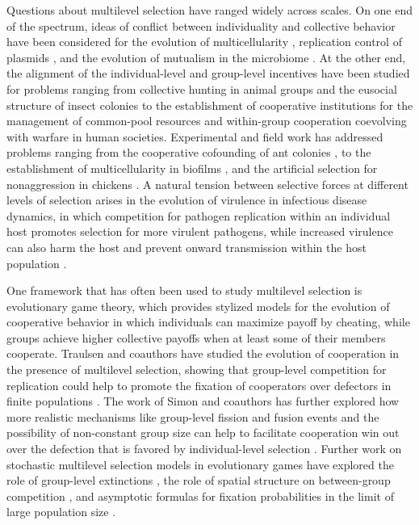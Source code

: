 \documentclass[11pt]{article}
\numberwithin{equation}{section}
\newcommand{\myindent}{\hspace{10mm}}
\begin{document}
{\myindent Questions about multilevel selection have ranged widely across scales. On one end of the spectrum, ideas of conflict between individuality and collective behavior have been considered for the evolution of multicellularity \cite{tarnita2013evolutionary,pichugin2018reproduction}, replication control of plasmids \cite{paulsson2002multileveled}, and the evolution of mutualism in the microbiome \cite{van2019role}. At the other end, the alignment of the individual-level and group-level incentives have been studied for problems ranging from collective hunting in animal groups \cite{boza2010beneficial} and the eusocial structure of insect colonies \cite{nowak2010evolution,fu2015risk} to the establishment of cooperative institutions for the management of common-pool resources \cite{ostrom2010beyond,schluter2016robustness,tavoni2012survival} and within-group cooperation coevolving with warfare \cite{henriques2019acculturation,turchin2010warfare} in human societies. Experimental and field work has addressed problems ranging from the cooperative cofounding of ant colonies \cite{shaffer2016foundress}, to the establishment of multicellularity in biofilms \cite{rose2020meta}, and the artificial selection for nonaggression in chickens \cite{muir1996group,bijma2007multilevel1,bijma2007multilevel2, wade2010group}. A natural tension between selective forces at different levels of selection arises in the evolution of virulence in infectious disease dynamics, in which competition for pathogen replication within an individual host promotes selection for more virulent pathogens, while increased virulence can also harm the host and prevent onward transmission within the host population \cite{levin1981selection,dwyer1990simulation,gilchrist2004optimizing,gilchrist2006evolution,blackstonevariation,boni2013virulence}.

\myindent One framework that has often been used to study multilevel selection is evolutionary game theory, which provides stylized models for the evolution of cooperative behavior in which individuals can maximize payoff by cheating, while groups achieve higher collective payoffs when at least some of their members cooperate. Traulsen and coauthors have studied the evolution of cooperation in the presence of multilevel selection, showing that group-level competition for replication could help to promote the fixation of cooperators over defectors in finite populations \cite{traulsen2005stochastic,traulsen2006evolution,traulsen2008analytical}.
The work of Simon and coauthors has further explored how more realistic mechanisms like group-level fission and fusion events and the possibility of non-constant group size can help to facilitate cooperation win out over the defection that is favored by individual-level selection \cite{simon2010dynamical,simon2012numerical,simon2013towards,simon2016group}. Further work on stochastic multilevel selection models in evolutionary games have explored the role of group-level extinctions \cite{bottcher2016promotion}, the role of spatial structure on between-group competition \cite{akdeniz2020cancellation}, and asymptotic formulas for fixation probabilities in the limit of large population size \cite{mcloone2018stochasticity}.

}
\end{document}
